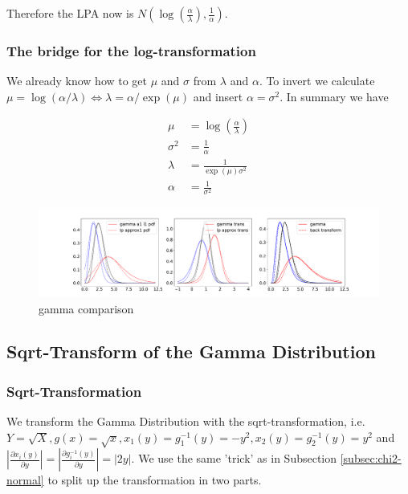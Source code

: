 Therefore the LPA now is $N(\log\left(\frac{\alpha}{\lambda}\right), \frac{1}{\alpha})$.

\subsubsection{The bridge for the log-transformation}

We already know how to get $\mu$ and $\sigma$ from $\lambda$ and $\alpha$. To invert we calculate $\mu = \log(\alpha/\lambda) \Leftrightarrow \lambda= \alpha/\exp(\mu)$ and insert $\alpha=\sigma^2$. In summary we have

\begin{align}
\mu &= \log\left(\frac{\alpha}{\lambda}\right) \\
\sigma^2 &= \frac{1}{\alpha} \\
\lambda &=  \frac{1}{\exp(\mu)\sigma^2}\\
\alpha &= \frac{1}{\sigma^2}
\end{align}

\begin{figure}[!htb]
	\centering
	\includegraphics[width=\textwidth]{figures/gamma_playground_log.pdf}
	\caption{gamma comparison}
	\label{fig:gamma_comparison}
\end{figure}

\subsection{Sqrt-Transform of the Gamma Distribution}

\subsubsection{Sqrt-Transformation}

We transform the Gamma Distribution with the sqrt-transformation, i.e. $Y = \sqrt{X}, g(x) = \sqrt{x},x_1(y) =  g_1^{-1}(y) = -y^2, x_2(y) = g_2^{-1}(y) = y^2$ and $\left\vert\frac{\partial x_i(y)}{\partial y} \right\vert = \left\vert\frac{\partial g_i^{-1}(y)}{\partial y} \right\vert = \vert 2y \vert$. We use the same 'trick' as in Subsection \ref{subsec:chi2-normal} to split up the transformation in two parts. 

